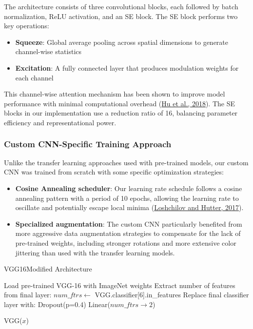 \documentclass[a4paper,12pt]{article}
\begin{document}
The architecture consists of three convolutional blocks, each followed by batch normalization, ReLU activation, and an SE block. The SE block performs two key operations:
\begin{itemize}
    \item \textbf{Squeeze}: Global average pooling across spatial dimensions to generate channel-wise statistics
    \item \textbf{Excitation}: A fully connected layer that produces modulation weights for each channel
\end{itemize}

This channel-wise attention mechanism has been shown to improve model performance with minimal computational overhead (\href{https://openaccess.thecvf.com/content_cvpr_2018/papers/Hu_Squeeze-and-Excitation_Networks_CVPR_2018_paper.pdf}{Hu et al., 2018}). The SE blocks in our implementation use a reduction ratio of 16, balancing parameter efficiency and representational power.

\subsubsection{Custom CNN-Specific Training Approach}

Unlike the transfer learning approaches used with pre-trained models, our custom CNN was trained from scratch with some specific optimization strategies:

\begin{itemize}
    \item \textbf{Cosine Annealing scheduler}: Our learning rate schedule follows a cosine annealing pattern with a period of 10 epochs, allowing the learning rate to oscillate and potentially escape local minima (\href{https://arxiv.org/abs/1608.03983}{Loshchilov and Hutter, 2017}).
    
    \item \textbf{Specialized augmentation}: The custom CNN particularly benefited from more aggressive data augmentation strategies to compensate for the lack of pre-trained weights, including stronger rotations and more extensive color jittering than used with the transfer learning models.
\end{itemize}

\begin{algorithm}
    \caption{VGG16Modified Architecture}
    \begin{algorithmic}[1]
        \State Load pre-trained VGG-16 with ImageNet weights
        \State Extract number of features from final layer: $num\_ftrs \gets$ VGG.classifier[6].in\_features
        \State Replace final classifier layer with:
        \Indent
            \State Dropout(p=0.4)
            \State Linear($num\_ftrs \to 2$) 
        \EndIndent
    \EndFunction
    
        \State \Return VGG($x$)
    \EndFunction
    \end{algorithmic}
    \end{algorithm}
\end{document}
